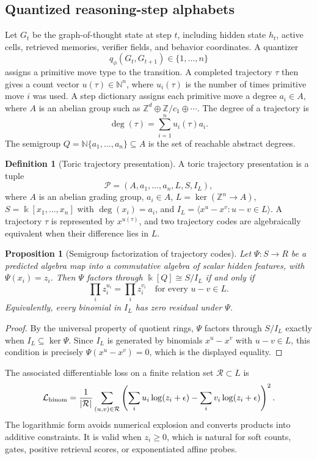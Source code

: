 \documentclass[11pt]{article}
\newtheorem{proposition}[theorem]{Proposition}
\theoremstyle{definition}
\newtheorem{definition}[theorem]{Definition}
\newcommand{\NN}{\mathbb{N}}
\newcommand{\ZZ}{\mathbb{Z}}
\newcommand{\kk}{\Bbbk}
\begin{document}
\subsection{Quantized reasoning-step alphabets}
Let \(G_t\) be the graph-of-thought state at step \(t\), including hidden state \(h_t\), active cells, retrieved memories, verifier fields, and behavior coordinates.  A quantizer
\[
q_\phi(G_t,G_{t+1})\in\{1,\ldots,n\}
\]
assigns a primitive move type to the transition.  A completed trajectory \(\tau\) then gives a count vector \(u(\tau)\in\NN^n\), where \(u_i(\tau)\) is the number of times primitive move \(i\) was used.  A step dictionary assigns each primitive move a degree \(a_i\in A\), where \(A\) is an abelian group such as \(\ZZ^d\oplus \ZZ/c_1\oplus\cdots\).  The degree of a trajectory is
\[
\deg(\tau)=\sum_{i=1}^n u_i(\tau)a_i.
\]
The semigroup \(Q=\NN\{a_1,\ldots,a_n\}\subseteq A\) is the set of reachable abstract degrees.

\begin{definition}[Toric trajectory presentation]
A toric trajectory presentation is a tuple
\[
\mathcal{P}=(A, a_1,\ldots,a_n, L, S, I_L),
\]
where \(A\) is an abelian grading group, \(a_i\in A\), \(L=\ker(\ZZ^n\to A)\), \(S=\kk[x_1,\ldots,x_n]\) with \(\deg(x_i)=a_i\), and \(I_L=\langle x^u-x^v:u-v\in L\rangle\).  A trajectory \(\tau\) is represented by \(x^{u(\tau)}\), and two trajectory codes are algebraically equivalent when their difference lies in \(L\).
\end{definition}

\begin{proposition}[Semigroup factorization of trajectory codes]
Let \(\Psi:S\to R\) be a predicted algebra map into a commutative algebra of scalar hidden features, with \(\Psi(x_i)=z_i\).  Then \(\Psi\) factors through \(\kk[Q]\cong S/I_L\) if and only if
\[
\prod_i z_i^{u_i}=\prod_i z_i^{v_i}\quad\text{for every }u-v\in L.
\]
Equivalently, every binomial in \(I_L\) has zero residual under \(\Psi\).
\end{proposition}
\begin{proof}
By the universal property of quotient rings, \(\Psi\) factors through \(S/I_L\) exactly when \(I_L\subseteq\ker\Psi\).  Since \(I_L\) is generated by binomials \(x^u-x^v\) with \(u-v\in L\), this condition is precisely \(\Psi(x^u-x^v)=0\), which is the displayed equality.
\end{proof}

The associated differentiable loss on a finite relation set \(\mathcal{R}\subset L\) is
\[
\mathcal{L}_{\rm binom}=\frac{1}{|\mathcal{R}|}\sum_{(u,v)\in\mathcal{R}}
\left(\sum_i u_i\log(z_i+\epsilon)-\sum_i v_i\log(z_i+\epsilon)\right)^2.
\]
The logarithmic form avoids numerical explosion and converts products into additive constraints.  It is valid when \(z_i\ge 0\), which is natural for soft counts, gates, positive retrieval scores, or exponentiated affine probes.
\end{document}

